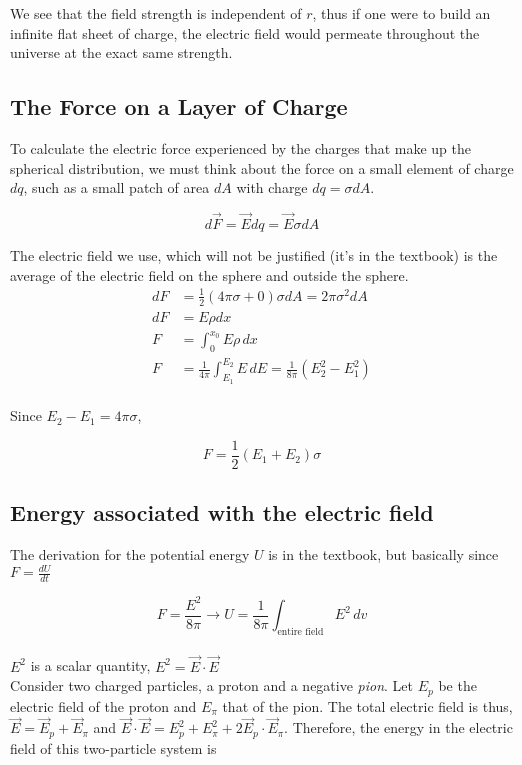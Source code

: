 \documentclass[svgnames]{article}
\begin{document}
We see that the field strength is independent of $r$, thus if one were to build
an infinite flat sheet of charge, the electric field would permeate throughout
the universe at the exact same strength. 

\subsection{The Force on a Layer of Charge}

\vspace{20px}

To calculate the electric force experienced by the charges that make up the
spherical distribution, we must think about the force on a small element of
charge $dq$, such as a small patch of area $dA$ with charge $dq = \sigma dA$. 

\[ d\vec{F} = \vec{E} dq = \vec{E} \sigma dA \]

The electric field we use, which will not be justified (it's in the textbook)
is the average of the electric field on the sphere and outside the sphere. \\ 

\begin{align*} 
 dF &= \frac{1}{2} (4\pi \sigma + 0)\sigma dA = 2\pi \sigma^2 dA\\
 dF &=  E \rho dx \\
 F &= \int_0^{x_0} E\rho \, dx \\
 F &= \frac{1}{4\pi} \int_{E_1}^{E_2} E \, dE = \frac{1}{8\pi} (E_2^2 - E_1^2)
 \end{align*} \\
 
 Since $E_2 - E_1 = 4\pi \sigma$, 
 
 \[ F = \frac{1}{2}(E_1 + E_2)\sigma \] 
 
 \subsection{Energy associated with the electric field} 
 
 The derivation for the potential energy $U$ is in the textbook, but basically since $F = \frac{dU}{dt}$
 
 \[ F = \frac{E^2}{8\pi} \rightarrow U = \frac{1}{8\pi} \int_\text{entire field} E^2 \, dv \] \\
 
 $E^2$ is a scalar quantity, $E^2 = \vec{E} \cdot \vec{E}$ \\
 
 Consider two charged particles, a proton and a negative \textit{pion}. Let
 $E_p$ be the electric field of the proton and $E_\pi$ that of the pion. The
 total electric field is thus, $\vec{E} = \vec{E}_p + \vec{E}_\pi$ and $\vec{E}
 \cdot \vec{E} = E_p^2 + E_\pi^2 + 2\vec{E}_p \cdot \vec{E}_\pi$. Therefore,
 the energy in the electric field of this two-particle system is 
 
\end{document}
